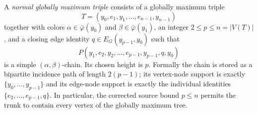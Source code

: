 \begin{definition}
A \emph{normal globally maximum triple} consists of a globally maximum
triple
\[
 T=(y_0,e_1,y_1,\ldots,e_{n-1},y_{n-1})
\]
together with colors $\alpha\in\overline\varphi(y_0)$ and
$\beta\in\overline\varphi(y_1)$, an integer
$2\le p\le n=|V(T)|$, and a closing edge identity
$q\in E_G(y_{p-1},y_0)$ such that
\[
 P(y_1,e_2,y_2,\ldots,e_{p-1},y_{p-1},q,y_0)
\]
is a simple $(\alpha,\beta)$-chain.  Its chosen height is $p$.  Formally
the chain is stored as a bipartite incidence path of length $2(p-1)$; its
vertex-node support is exactly $\{y_0,\ldots,y_{p-1}\}$ and its edge-node
support is exactly the individual identities
$\{e_2,\ldots,e_{p-1},q\}$.  In particular, the corrected source bound
$p\le n$ permits the trunk to contain every vertex of the globally maximum
tree.
\end{definition}
